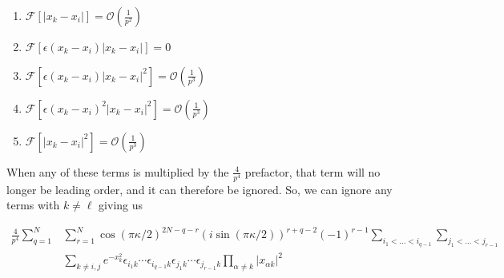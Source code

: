 \documentclass[onecolumn,english,aps,pra]{revtex4}
\begin{document}
\begin{enumerate}
\item $\mathcal{F}[|x_{k} - x_{i}|] = \mathcal{O}(\frac{1}{p^2})$
\item $\mathcal{F}[\epsilon(x_{k} - x_{i})|x_{k} - x_{i}|] = 0$
\item $\mathcal{F}[\epsilon(x_{k} - x_{i})|x_{k} - x_{i}|^2] = \mathcal{O}(\frac{1}{p^3})$
\item $\mathcal{F}[\epsilon(x_{k} - x_{i})^2|x_{k} - x_{i}|^2] = \mathcal{O}(\frac{1}{p^3})$
\item $\mathcal{F}[|x_{k} - x_{i}|^2] = \mathcal{O}(\frac{1}{p^3})$
\end{enumerate}
When any of these terms is multiplied by the $\frac{4}{p^4}$ prefactor, that term will no longer be leading order, and it can therefore be ignored. So, we can ignore any terms with $k \neq \ell$ giving us

\begin{align*}
\frac{4}{p^4}  \sum_{q = 1}^{N} & \sum_{r = 1}^{N} \cos(\pi \kappa /2)^{2N-q-r} (i \sin(\pi \kappa /2))^{r+q-2} (-1)^{r-1} 
\sum_{i_{1} < \ldots < i_{q - 1}} \sum_{j_{1} < \ldots < j_{r - 1}}\\
&\sum_{k \neq i, j} 
e^{-x_{k}^{2}} 
\epsilon_{i_{1}k} \cdots \epsilon_{i_{q-1}k}
\epsilon_{j_{1}k} \cdots \epsilon_{j_{r-1}k}
\prod_{\alpha \neq k} |x_{\alpha k}|^2
\end{align*}

	
\end{document}
